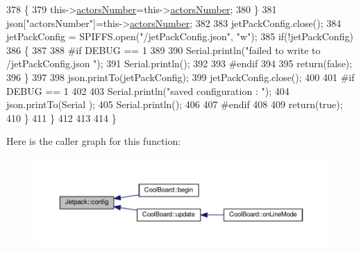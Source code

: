 \begin{DoxyCode}
378             \{
379                 this->\hyperlink{classJetpack_a52c86319cb3f7f1ab744a64db18a7ba5}{actorsNumber}=this->\hyperlink{classJetpack_a52c86319cb3f7f1ab744a64db18a7ba5}{actorsNumber};
380             \}
381             json[\textcolor{stringliteral}{"actorsNumber"}]=this->\hyperlink{classJetpack_a52c86319cb3f7f1ab744a64db18a7ba5}{actorsNumber};
382 
383             jetPackConfig.close();          
384             jetPackConfig = SPIFFS.open(\textcolor{stringliteral}{"/jetPackConfig.json"}, \textcolor{stringliteral}{"w"});            
385             \textcolor{keywordflow}{if}(!jetPackConfig)
386             \{
387             
388 \textcolor{preprocessor}{            #if DEBUG == 1 }
389 
390                 Serial.println(\textcolor{stringliteral}{"failed to write to /jetPackConfig.json "});
391                 Serial.println();
392             
393 \textcolor{preprocessor}{            #endif}
394                 
395                 \textcolor{keywordflow}{return}(\textcolor{keyword}{false});          
396             \}  
397 
398             json.printTo(jetPackConfig);
399             jetPackConfig.close();
400 
401 \textcolor{preprocessor}{        #if DEBUG == 1 }
402             
403             Serial.println(\textcolor{stringliteral}{"saved configuration : "});
404             json.printTo(Serial );
405             Serial.println();       
406         
407 \textcolor{preprocessor}{        #endif}
408 
409             \textcolor{keywordflow}{return}(\textcolor{keyword}{true}); 
410         \}
411     \}   
412     
413 
414 \}
\end{DoxyCode}
Here is the caller graph for this function\+:\nopagebreak
\begin{figure}[H]
\begin{center}
\leavevmode
\includegraphics[width=350pt]{classJetpack_ab065ee83e244265a2223a22f3ee4a719_icgraph}
\end{center}
\end{figure}
\mbox{\label{classJetpack_a86d2e83436ef4b85f4c3a6e85ac785b0}} 
